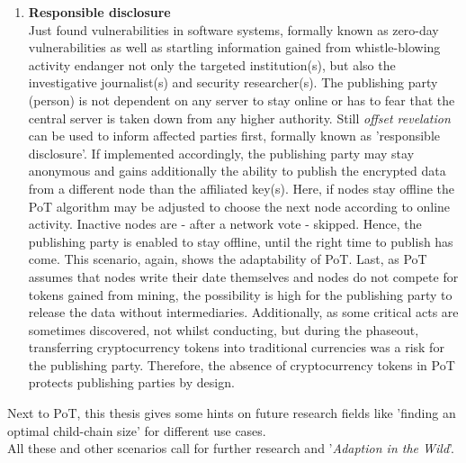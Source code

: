 \begin{enumerate}
	\item \textbf{Responsible disclosure} \\
	Just found vulnerabilities in software systems, formally known as zero-day vulnerabilities
	as well as startling information gained from whistle-blowing activity endanger not only the targeted institution(s),
	but also the investigative journalist(s) and security researcher(s).
	The publishing party (person) is not dependent on any server to stay online or
	has to fear that the central server is taken down from any higher authority.
	Still \textit{offset revelation} can be used to inform affected parties first,
	formally known as 'responsible disclosure'.
	If implemented accordingly, the publishing party may stay anonymous and
	gains additionally the ability to publish the encrypted data from a different node than the affiliated key(s).
	Here, if nodes stay offline the \gls{PoT} algorithm may be adjusted to choose the next node according to online activity.
	Inactive nodes are - after a network vote - skipped.
	Hence, the publishing party is enabled to stay offline, until the right time to publish has come.
	This scenario, again, shows the adaptability of \gls{PoT}.
	Last, as \gls{PoT} assumes that nodes write their date themselves and
	nodes do not compete for tokens gained from mining, the possibility is
	high for the publishing party to release the data without intermediaries.
	Additionally, as some critical acts are sometimes discovered, not whilst conducting, but during the phaseout,
	transferring cryptocurrency tokens into traditional currencies was a risk for the publishing party.
	Therefore, the absence of cryptocurrency tokens in \gls{PoT} protects publishing parties by design.
			
\end{enumerate}

\noindent Next to \gls{PoT}, this thesis gives some hints on future research fields like
'finding an optimal child-chain size' for different use cases. \\
All these and other scenarios call for further research and '\textit{Adaption in the Wild}'.



